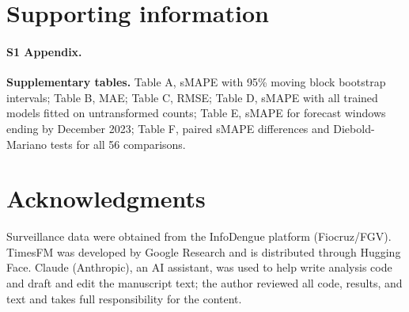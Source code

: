 \documentclass[10pt,letterpaper]{article}
\begin{document}
\section*{Supporting information}

\paragraph*{S1 Appendix.}
\label{S1_Appendix}
\textbf{Supplementary tables.} Table A, sMAPE with 95\% moving block bootstrap intervals; Table B, MAE; Table C, RMSE; Table D, sMAPE with all trained models fitted on untransformed counts; Table E, sMAPE for forecast windows ending by December 2023; Table F, paired sMAPE differences and Diebold-Mariano tests for all 56 comparisons.

\section*{Acknowledgments}
Surveillance data were obtained from the InfoDengue platform (Fiocruz/FGV). TimesFM was developed by Google Research and is distributed through Hugging Face. Claude (Anthropic), an AI assistant, was used to help write analysis code and draft and edit the manuscript text; the author reviewed all code, results, and text and takes full responsibility for the content.

\nolinenumbers
\end{document}
